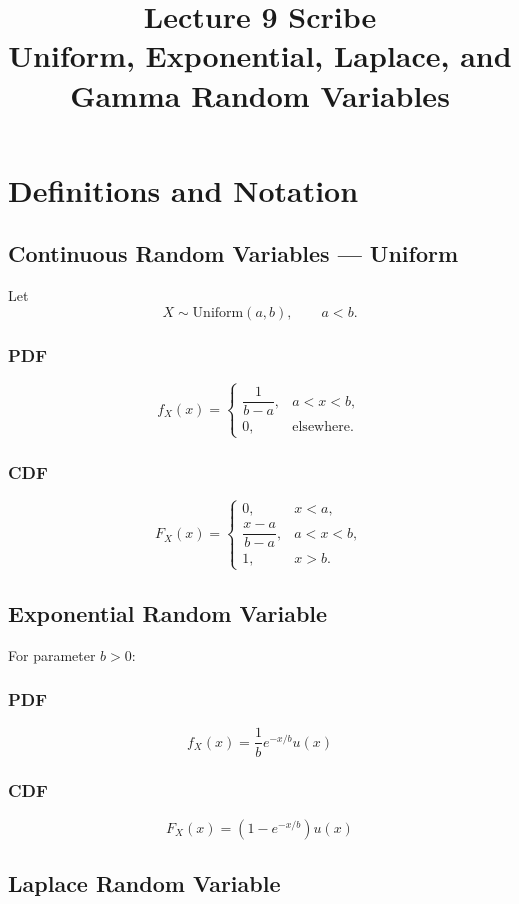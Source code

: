 \documentclass[11pt]{article}
\title{Lecture 9 Scribe\\
Uniform, Exponential, Laplace, and Gamma Random Variables}
\author{}
\date{}
\begin{document}
\maketitle

\section{Definitions and Notation}

\subsection{Continuous Random Variables — Uniform}

Let
\[
X \sim \text{Uniform}(a,b), \qquad a<b.
\]

\subsubsection*{PDF}
\[
f_X(x)=
\begin{cases}
\dfrac{1}{b-a}, & a<x<b,\\[6pt]
0, & \text{elsewhere}.
\end{cases}
\]

\subsubsection*{CDF}
\[
F_X(x)=
\begin{cases}
0, & x<a,\\[6pt]
\dfrac{x-a}{b-a}, & a<x<b,\\[6pt]
1, & x>b.
\end{cases}
\]

\subsection{Exponential Random Variable}

For parameter $b>0$:

\subsubsection*{PDF}
\[
f_X(x)=\frac{1}{b}e^{-x/b}u(x)
\]

\subsubsection*{CDF}
\[
F_X(x)=\left(1-e^{-x/b}\right)u(x)
\]

\subsection{Laplace Random Variable}
\end{document}
